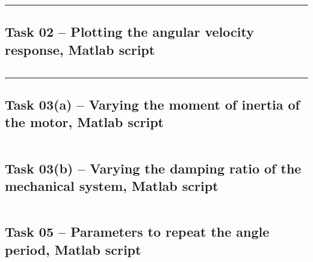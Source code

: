 \documentclass[12pt]{article}
\def\hr{{\par\noindent\rule{\textwidth}{0.4pt}}}
\begin{document}
\hr{}

\subsection{Task 02 -- Plotting the angular velocity response, Matlab script}\label{sap:plotting angular velocity}
\inputminted{matlab}{src/lab08_task02_plot_angular_velocity.m}

\hr{}

\subsection{Task 03(a) -- Varying the moment of inertia of the motor, Matlab script}\label{sap:vary moment of inertia}
\inputminted{matlab}{src/lab08_task03a_vary_motor_moment_of_inertia.m}

\subsection{Task 03(b) -- Varying the damping ratio of the mechanical system, Matlab script}\label{sap:vary damping ratio}
\inputminted{matlab}{src/lab08_task03b_vary_mechanical_sys_damping.m}

\subsection{Task 05 -- Parameters to repeat the angle period, Matlab script}\label{sap:repeat angle params}
\inputminted{matlab}{src/lab08_task05_angle_repeat_params.m}
\end{document}
